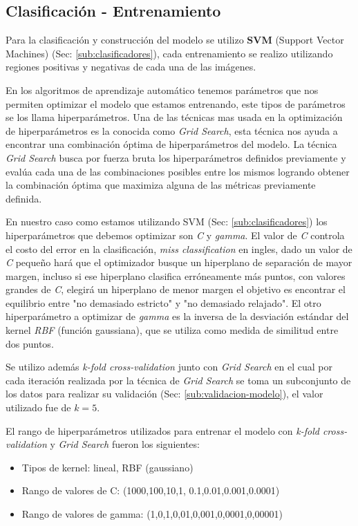 \subsection*{Clasificación - Entrenamiento}\label{sub:entr_class}

Para la clasificación y construcción del modelo se utilizo \textbf{SVM} (Support Vector Machines) (Sec: \ref{sub:clasificadores}), cada entrenamiento se realizo utilizando regiones positivas y negativas de cada una de las imágenes.

En los algoritmos de aprendizaje automático tenemos parámetros que nos permiten optimizar el modelo que estamos entrenando, este tipos de parámetros se los llama hiperparámetros. Una de las técnicas mas usada en la optimización de hiperparámetros es la conocida como \textit{Grid Search}, esta técnica nos ayuda a encontrar una combinación óptima de hiperparámetros del modelo. La técnica \textit{Grid Search} busca por fuerza bruta los hiperparámetros definidos previamente y evalúa cada una de las combinaciones posibles entre los mismos logrando obtener la combinación óptima que maximiza alguna de las métricas previamente definida. 

En nuestro caso como estamos utilizando SVM (Sec: \ref{sub:clasificadores}) los hiperparámetros que debemos optimizar son \textit{C} y \textit{gamma}. El valor de \textit{C} controla el costo del error en la clasificación, \textit{miss classification} en ingles, dado un valor de \textit{C} pequeño hará que el optimizador busque un hiperplano de separación de mayor margen, incluso si ese hiperplano clasifica erróneamente más puntos, con valores grandes de \textit{C},  elegirá un hiperplano de menor margen el objetivo es encontrar el equilibrio entre "no demasiado estricto" y  "no demasiado relajado". El otro hiperparámetro a  optimizar de  \textit{gamma} es la inversa de la desviación estándar del kernel \textit{RBF} (función gaussiana), que se utiliza como medida de similitud entre dos puntos.

Se utilizo además \textit{k-fold cross-validation} junto con \textit{Grid Search} en el cual por cada iteración realizada por la técnica de \textit{Grid Search} se toma un subconjunto de los datos para realizar su validación (Sec: \ref{sub:validacion-modelo}), el valor utilizado fue de $k=5$.

El rango de hiperparámetros utilizados para entrenar el modelo con  \textit{k-fold cross-validation} y \textit{Grid Search} fueron los siguientes: 
\begin{itemize}
    \item Tipos de kernel: lineal, RBF (gaussiano)
    \item Rango de valores de C: (1000,100,10,1, 0.1,0.01,0.001,0.0001)
    \item Rango de valores de gamma: (1,0,1,0,01,0,001,0,0001,0,00001)
\end{itemize}

